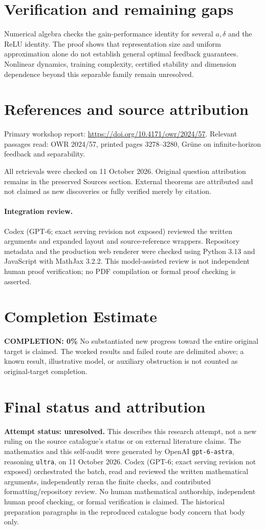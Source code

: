 \documentclass[11pt]{article}
\begin{document}
\section{Verification and remaining gaps}
Numerical algebra checks the gain-performance identity for several $a,\delta$ and the ReLU identity. The proof shows that representation size and uniform approximation alone do not establish general optimal feedback guarantees. Nonlinear dynamics, training complexity, certified stability and dimension dependence beyond this separable family remain unresolved.

\section{References and source attribution}
Primary workshop report: \url{https://doi.org/10.4171/owr/2024/57}. Relevant passages read: OWR 2024/57, printed pages 3278--3280, Grüne on infinite-horizon feedback and separability.

All retrievals were checked on 11 October 2026. Original question attribution remains in the preserved Sources section. External theorems are attributed and not claimed as new discoveries or fully verified merely by citation.


\paragraph{Integration review.} Codex (GPT-6; exact serving revision not exposed) reviewed the written arguments and expanded layout and source-reference wrappers. Repository metadata and the production web renderer were checked using Python 3.13 and JavaScript with MathJax 3.2.2. This model-assisted review is not independent human proof verification; no PDF compilation or formal proof checking is asserted.

\section{Completion Estimate}
\noindent\textbf{COMPLETION: 0\%}
No substantiated new progress toward the entire original target is claimed. The worked results and failed route are delimited above; a known result, illustrative model, or auxiliary obstruction is not counted as original-target completion.

\section{Final status and attribution}
\textbf{Attempt status: unresolved.} This describes this research attempt, not a new ruling on the source catalogue's status or on external literature claims.
The mathematics and this self-audit were generated by OpenAI \texttt{gpt-6-astra}, reasoning \texttt{ultra}, on 11 October 2026. Codex (GPT-6; exact serving revision not exposed) orchestrated the batch, read and reviewed the written mathematical arguments, independently reran the finite checks, and contributed formatting/repository review. No human mathematical authorship, independent human proof checking, or formal verification is claimed. The historical preparation paragraphs in the reproduced catalogue body concern that body only.
\end{document}
